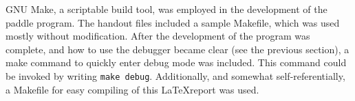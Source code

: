 GNU Make, a scriptable build tool, was employed in the development of the paddle program.
The handout files included a sample Makefile, which was used mostly without modification.
After the development of the program was complete, and how to use the debugger became clear (see the previous section), a make command to quickly enter debug mode was included.
This command could be invoked by writing \texttt{make debug}.
Additionally, and somewhat self-referentially, a Makefile for easy compiling of this \LaTeX report was used.
